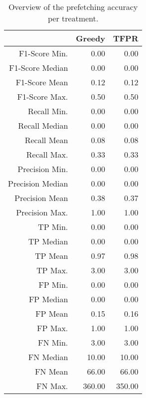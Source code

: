 \begin{table}[ht]
\centering
\begin{tabular}{rrr}
  \hline
 & Greedy & TFPR \\ 
  \hline
F1-Score Min. & 0.00 & 0.00 \\ 
  F1-Score Median & 0.00 & 0.00 \\ 
  F1-Score Mean & 0.12 & 0.12 \\ 
  F1-Score Max. & 0.50 & 0.50 \\ 
  Recall Min. & 0.00 & 0.00 \\ 
  Recall Median & 0.00 & 0.00 \\ 
  Recall Mean & 0.08 & 0.08 \\ 
  Recall Max. & 0.33 & 0.33 \\ 
  Precision Min. & 0.00 & 0.00 \\ 
  Precision Median & 0.00 & 0.00 \\ 
  Precision Mean & 0.38 & 0.37 \\ 
  Precision Max. & 1.00 & 1.00 \\ 
  TP Min. & 0.00 & 0.00 \\ 
  TP Median & 0.00 & 0.00 \\ 
  TP Mean & 0.97 & 0.98 \\ 
  TP Max. & 3.00 & 3.00 \\ 
  FP Min. & 0.00 & 0.00 \\ 
  FP Median & 0.00 & 0.00 \\ 
  FP Mean & 0.15 & 0.16 \\ 
  FP Max. & 1.00 & 1.00 \\ 
  FN Min. & 3.00 & 3.00 \\ 
  FN Median & 10.00 & 10.00 \\ 
  FN Mean & 66.00 & 66.00 \\ 
  FN Max. & 360.00 & 350.00 \\ 
   \hline
\end{tabular}
\caption{Overview of the prefetching accuracy per treatment.} 
\label{tab:results:rq3:summary:treatment}
\end{table}
